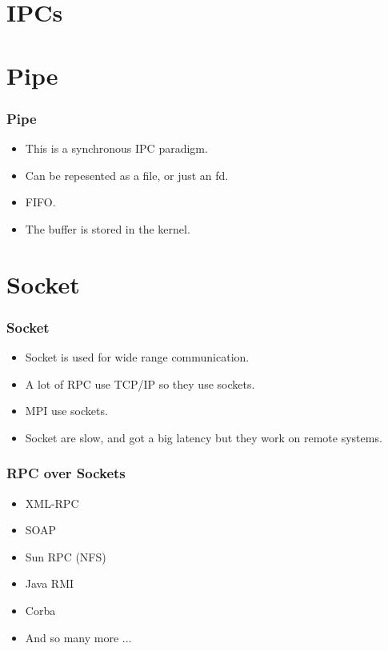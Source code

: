 \section{IPCs}
\section{Pipe}
\begin{frame}
\frametitle{Pipe}

\begin{itemize}
\item This is a synchronous IPC paradigm.
\item Can be repesented as a file, or just an fd.
\item FIFO.
\item The buffer is stored in the kernel.
\end{itemize}
\end{frame}

\section{Socket}
\begin{frame}
\frametitle{Socket}
\begin{itemize}
\item Socket is used for wide range communication.
\item A lot of RPC use TCP/IP so they use sockets.
\item MPI use sockets.
\item Socket are slow, and got a big latency but they work on remote
systems.
\end{itemize}
\end{frame}

\begin{frame}
\frametitle{RPC over Sockets}
\begin{itemize}
\item XML-RPC
\item SOAP
\item Sun RPC (NFS)
\item Java RMI
\item Corba
\item And so many more ...
\end{itemize}
\end{frame}

